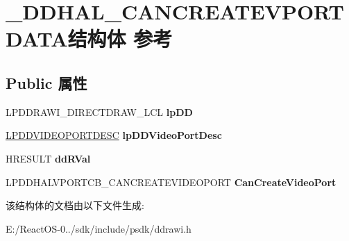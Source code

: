 \hypertarget{struct___d_d_h_a_l___c_a_n_c_r_e_a_t_e_v_p_o_r_t_d_a_t_a}{}\section{\+\_\+\+D\+D\+H\+A\+L\+\_\+\+C\+A\+N\+C\+R\+E\+A\+T\+E\+V\+P\+O\+R\+T\+D\+A\+T\+A结构体 参考}
\label{struct___d_d_h_a_l___c_a_n_c_r_e_a_t_e_v_p_o_r_t_d_a_t_a}
\subsection*{Public 属性}
\begin{DoxyCompactItemize}
\item 
\mbox{\label{struct___d_d_h_a_l___c_a_n_c_r_e_a_t_e_v_p_o_r_t_d_a_t_a_a387379cbd2bba25569c0f5d71fd481a8}} 
L\+P\+D\+D\+R\+A\+W\+I\+\_\+\+D\+I\+R\+E\+C\+T\+D\+R\+A\+W\+\_\+\+L\+CL {\bfseries lp\+DD}
\item 
\mbox{\label{struct___d_d_h_a_l___c_a_n_c_r_e_a_t_e_v_p_o_r_t_d_a_t_a_ac431831710a6499406ff255780de38dd}} 
\hyperlink{struct___d_d_v_i_d_e_o_p_o_r_t_d_e_s_c}{L\+P\+D\+D\+V\+I\+D\+E\+O\+P\+O\+R\+T\+D\+E\+SC} {\bfseries lp\+D\+D\+Video\+Port\+Desc}
\item 
\mbox{\label{struct___d_d_h_a_l___c_a_n_c_r_e_a_t_e_v_p_o_r_t_d_a_t_a_ab4bd72ee56e69fc2ae0ab33b065659e8}} 
H\+R\+E\+S\+U\+LT {\bfseries dd\+R\+Val}
\item 
\mbox{\label{struct___d_d_h_a_l___c_a_n_c_r_e_a_t_e_v_p_o_r_t_d_a_t_a_a27123af567da382db9177b23b91a3988}} 
L\+P\+D\+D\+H\+A\+L\+V\+P\+O\+R\+T\+C\+B\+\_\+\+C\+A\+N\+C\+R\+E\+A\+T\+E\+V\+I\+D\+E\+O\+P\+O\+RT {\bfseries Can\+Create\+Video\+Port}
\end{DoxyCompactItemize}


该结构体的文档由以下文件生成\+:\begin{DoxyCompactItemize}
\item 
E\+:/\+React\+O\+S-\/0../sdk/include/psdk/ddrawi.\+h\end{DoxyCompactItemize}
